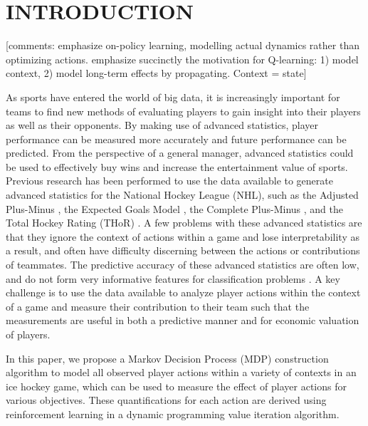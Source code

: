 \documentclass[]{article}
\begin{document}


\section{INTRODUCTION}
[comments: emphasize on-policy learning, modelling actual dynamics rather than optimizing actions. emphasize succinctly the motivation for Q-learning: 1) model context, 2) model long-term effects by propagating. Context = state] 

As sports have entered the world of big data, it is increasingly important for teams to find new methods of evaluating players to gain insight into their players as well as their opponents. By making use of advanced statistics, player performance can be measured more accurately and future performance can be predicted. From the perspective of a general manager, advanced statistics could be used to effectively buy wins and increase the entertainment value of sports. Previous research has been performed to use the data available to generate advanced statistics for the National Hockey League (NHL), such as the Adjusted Plus-Minus \citep{Macdonald2011a}, the Expected Goals Model \citep{Macdonald2012}, the Complete Plus-Minus \citep{Spagnola2013}, and the Total Hockey Rating (THoR) \citep{Schuckers2013}. A few problems with these advanced statistics are that they ignore the context of actions within a game and lose interpretability as a result, and often have difficulty discerning between the actions or contributions of teammates. The predictive accuracy of these advanced statistics are often low, and do not form very informative features for classification problems \citep{Weissbock2014}. A key challenge is to use the data available to analyze player actions within the context of a game and measure their contribution to their team such that the measurements are useful in both a predictive manner and for economic valuation of players.

In this paper, we propose a Markov Decision Process (MDP) construction algorithm to model all observed player actions within a variety of contexts in an ice hockey game, which can be used to measure the effect of player actions for various objectives. These quantifications for each action are derived using reinforcement learning in a dynamic programming value iteration algorithm.
\end{document}
